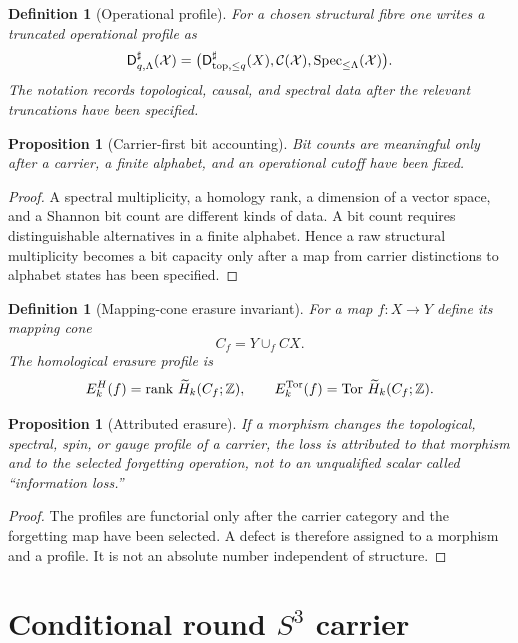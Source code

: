 \documentclass[11pt,a4paper]{article}
\newtheorem{proposition}[theorem]{Proposition}
\newtheorem{definition}[theorem]{Definition}
\newcommand{\DRD}{\mathsf D^{\sharp}}
\newcommand{\Spec}{\operatorname{Spec}}
\begin{document}
\begin{definition}[Operational profile]
For a chosen structural fibre one writes a truncated operational profile as
\[
\DRD_{q,\Lambda}(\mathcal X)=
\bigl(\DRD_{{\rm top},\le q}(X),\mathcal C(\mathcal X),\Spec_{\le\Lambda}(\mathcal X)\bigr).
\]
The notation records topological, causal, and spectral data after the relevant truncations have been specified.
\end{definition}

\begin{proposition}[Carrier-first bit accounting]
Bit counts are meaningful only after a carrier, a finite alphabet, and an operational cutoff have been fixed.
\end{proposition}
\begin{proof}
A spectral multiplicity, a homology rank, a dimension of a vector space, and a Shannon bit count are different kinds of data.  A bit count requires distinguishable alternatives in a finite alphabet.  Hence a raw structural multiplicity becomes a bit capacity only after a map from carrier distinctions to alphabet states has been specified.
\end{proof}

\begin{definition}[Mapping-cone erasure invariant]
For a map $f:X\to Y$ define its mapping cone
\[
C_f=Y\cup_f CX.
\]
The homological erasure profile is
\[
E_k^H(f)=\operatorname{rank}\,\widetilde H_k(C_f;\mathbb Z),
\qquad
E_k^{\rm Tor}(f)=\operatorname{Tor}\,\widetilde H_k(C_f;\mathbb Z).
\]
\end{definition}

\begin{proposition}[Attributed erasure]
If a morphism changes the topological, spectral, spin, or gauge profile of a carrier, the loss is attributed to that morphism and to the selected forgetting operation, not to an unqualified scalar called ``information loss.''
\end{proposition}
\begin{proof}
The profiles are functorial only after the carrier category and the forgetting map have been selected.  A defect is therefore assigned to a morphism and a profile.  It is not an absolute number independent of structure.
\end{proof}

\section[Conditional round S3 carrier]{Conditional round $S^3$ carrier}
\label{sec:conditional-carrier}
\end{document}
